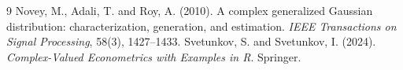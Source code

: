 \documentclass[11pt,a4paper]{article}
\newcommand{\1}{\mathbf{1}}
\begin{document}
\begin{thebibliography}{9}
Novey, M., Adali, T. and Roy, A. (2010). A complex generalized Gaussian distribution:
characterization, generation, and estimation. \emph{IEEE Transactions on Signal Processing},
58(3), 1427--1433.
Svetunkov, S. and Svetunkov, I. (2024). \emph{Complex-Valued Econometrics with Examples in R}.
Springer.
\end{thebibliography}
\end{document}
